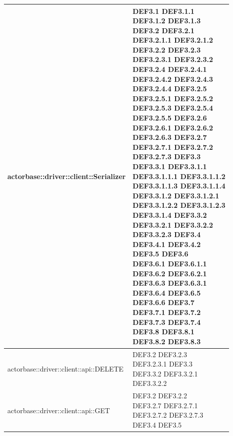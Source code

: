 \documentclass{scalatekids-article}
\begin{document}
\begin{longtable}[H]{|p{12cm}|p{5.5cm}|}
actorbase::driver::client::Serializer & \multiLineCell[t]{DEF3.1 DEF3.1.1\\DEF3.1.2 DEF3.1.3\\DEF3.2 DEF3.2.1\\DEF3.2.1.1 DEF3.2.1.2\\DEF3.2.2 DEF3.2.3\\DEF3.2.3.1 DEF3.2.3.2\\DEF3.2.4 DEF3.2.4.1\\DEF3.2.4.2 DEF3.2.4.3\\DEF3.2.4.4 DEF3.2.5\\DEF3.2.5.1 DEF3.2.5.2\\DEF3.2.5.3 DEF3.2.5.4\\DEF3.2.5.5 DEF3.2.6\\DEF3.2.6.1 DEF3.2.6.2\\DEF3.2.6.3 DEF3.2.7\\DEF3.2.7.1 DEF3.2.7.2\\DEF3.2.7.3 DEF3.3\\DEF3.3.1 DEF3.3.1.1\\DEF3.3.1.1.1 DEF3.3.1.1.2\\DEF3.3.1.1.3 DEF3.3.1.1.4\\DEF3.3.1.2 DEF3.3.1.2.1\\DEF3.3.1.2.2 DEF3.3.1.2.3\\DEF3.3.1.4 DEF3.3.2\\DEF3.3.2.1 DEF3.3.2.2\\DEF3.3.2.3 DEF3.4\\DEF3.4.1 DEF3.4.2\\DEF3.5 DEF3.6\\DEF3.6.1 DEF3.6.1.1\\DEF3.6.2 DEF3.6.2.1\\DEF3.6.3 DEF3.6.3.1\\DEF3.6.4 DEF3.6.5\\DEF3.6.6 DEF3.7\\DEF3.7.1 DEF3.7.2\\DEF3.7.3 DEF3.7.4\\DEF3.8 DEF3.8.1\\DEF3.8.2 DEF3.8.3\\}\\
\hline
actorbase::driver::client::api::DELETE & \multiLineCell[t]{DEF3.2 DEF3.2.3\\DEF3.2.3.1 DEF3.3\\DEF3.3.2 DEF3.3.2.1\\DEF3.3.2.2}\\
\hline
actorbase::driver::client::api::GET & \multiLineCell[t]{DEF3.2 DEF3.2.2\\DEF3.2.7 DEF3.2.7.1\\DEF3.2.7.2 DEF3.2.7.3\\DEF3.4 DEF3.5\\}\\

\end{longtable}
\end{document}
